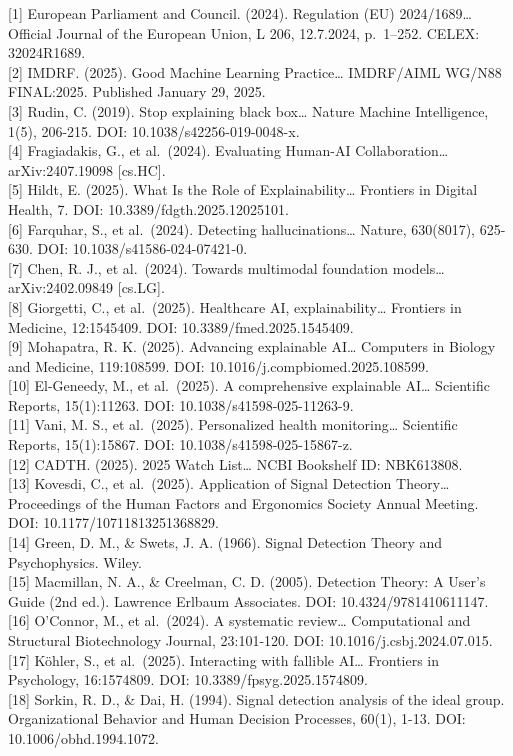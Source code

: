 \documentclass[a4paper]{article}
\begin{document}
{[}1{]} European Parliament and Council. (2024). Regulation (EU)
2024/1689\ldots{} Official Journal of the European Union, L 206,
12.7.2024, p.~1--252. CELEX: 32024R1689.\\
{[}2{]} IMDRF. (2025). Good Machine Learning Practice\ldots{} IMDRF/AIML
WG/N88 FINAL:2025. Published January 29, 2025.\\
{[}3{]} Rudin, C. (2019). Stop explaining black box\ldots{} Nature
Machine Intelligence, 1(5), 206-215. DOI: 10.1038/s42256-019-0048-x.\\
{[}4{]} Fragiadakis, G., et al.~(2024). Evaluating Human-AI
Collaboration\ldots{} arXiv:2407.19098 {[}cs.HC{]}.\\
{[}5{]} Hildt, E. (2025). What Is the Role of Explainability\ldots{}
Frontiers in Digital Health, 7. DOI: 10.3389/fdgth.2025.12025101.\\
{[}6{]} Farquhar, S., et al.~(2024). Detecting hallucinations\ldots{}
Nature, 630(8017), 625-630. DOI: 10.1038/s41586-024-07421-0.\\
{[}7{]} Chen, R. J., et al.~(2024). Towards multimodal foundation
models\ldots{} arXiv:2402.09849 {[}cs.LG{]}.\\
{[}8{]} Giorgetti, C., et al.~(2025). Healthcare AI,
explainability\ldots{} Frontiers in Medicine, 12:1545409. DOI:
10.3389/fmed.2025.1545409.\\
{[}9{]} Mohapatra, R. K. (2025). Advancing explainable AI\ldots{}
Computers in Biology and Medicine, 119:108599. DOI:
10.1016/j.compbiomed.2025.108599.\\
{[}10{]} El-Geneedy, M., et al.~(2025). A comprehensive explainable
AI\ldots{} Scientific Reports, 15(1):11263. DOI:
10.1038/s41598-025-11263-9.\\
{[}11{]} Vani, M. S., et al.~(2025). Personalized health
monitoring\ldots{} Scientific Reports, 15(1):15867. DOI:
10.1038/s41598-025-15867-z.\\
{[}12{]} CADTH. (2025). 2025 Watch List\ldots{} NCBI Bookshelf ID:
NBK613808.\\
{[}13{]} Kovesdi, C., et al.~(2025). Application of Signal Detection
Theory\ldots{} Proceedings of the Human Factors and Ergonomics Society
Annual Meeting. DOI: 10.1177/10711813251368829.\\
{[}14{]} Green, D. M., \& Swets, J. A. (1966). Signal Detection Theory
and Psychophysics. Wiley.\\
{[}15{]} Macmillan, N. A., \& Creelman, C. D. (2005). Detection Theory:
A User's Guide (2nd ed.). Lawrence Erlbaum Associates. DOI:
10.4324/9781410611147.\\
{[}16{]} O'Connor, M., et al.~(2024). A systematic review\ldots{}
Computational and Structural Biotechnology Journal, 23:101-120. DOI:
10.1016/j.csbj.2024.07.015.\\
{[}17{]} Köhler, S., et al.~(2025). Interacting with fallible AI\ldots{}
Frontiers in Psychology, 16:1574809. DOI: 10.3389/fpsyg.2025.1574809.\\
{[}18{]} Sorkin, R. D., \& Dai, H. (1994). Signal detection analysis of
the ideal group. Organizational Behavior and Human Decision Processes,
60(1), 1-13. DOI: 10.1006/obhd.1994.1072.
\end{document}
